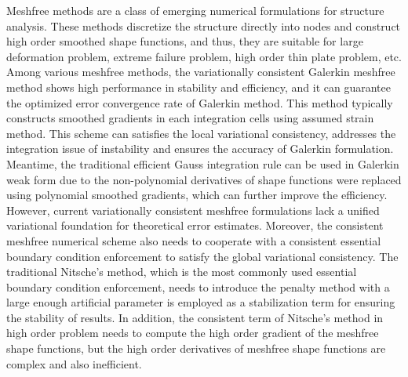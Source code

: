 \begin{abstractEn}
Meshfree methods are a class of emerging numerical formulations for structure analysis. 
These methods discretize the structure directly into nodes and construct high order smoothed shape functions, and thus, they are suitable for large deformation problem, extreme failure problem, high order thin plate problem, etc.
Among various meshfree methods, the variationally consistent Galerkin meshfree method shows high performance in stability and efficiency, and it can guarantee the optimized error convergence rate of Galerkin method.
This method typically constructs smoothed gradients in each integration cells using assumed strain method. This scheme can satisfies the local variational consistency, addresses the integration issue of instability and ensures the accuracy of Galerkin formulation.
Meantime, the traditional efficient Gauss integration rule can be used in Galerkin weak form due to the non-polynomial derivatives of shape functions were replaced using polynomial smoothed gradients, which can further improve the efficiency.
However, current variationally consistent meshfree formulations lack a unified variational foundation for theoretical error estimates.
Moreover, the consistent meshfree numerical scheme also needs to cooperate with a consistent essential boundary condition enforcement to satisfy the global variational consistency.
The traditional Nitsche's method, which is the most commonly used essential boundary condition enforcement, needs to introduce the penalty method with a large enough artificial parameter is employed as a stabilization term for ensuring the stability of results.
In addition, the consistent term of Nitsche's method in high order problem needs to compute the high order gradient of the meshfree shape functions, but the high order derivatives of meshfree shape functions are complex and also inefficient.


\end{abstractEn}
